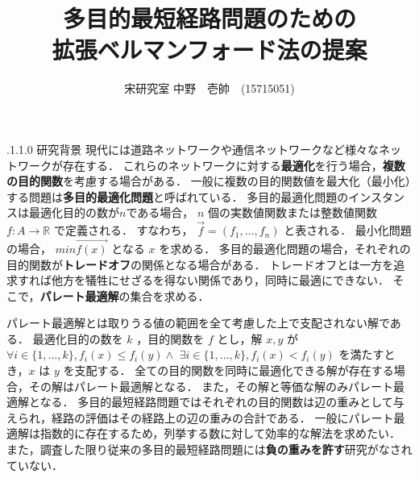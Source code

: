 \documentclass[oneside, 10pt, twocolumn]{jarticle}
\title{\bf{\rm}
多目的最短経路問題のための
\\拡張ベルマンフォード法の提案}
\author{宋研究室
\hspace{15pt}
中野　壱帥　(15715051)}
\date{}
\makeatletter
\def\section{\@startsection {section}{1}{\z@}{-3.5ex plus -1ex minus
-.2ex}{2.3 ex plus .2ex}{\large\bf}}
\renewcommand{\section}{
\@startsection{section}{1}{\z@}
{.1\Cvs \@plus.0\Cdp \@minus.1\Cdp}%
{.1\Cvs \@plus.1\Cdp \@minus.0\Cdp}%
{\reset@font\large\bfseries}}      %
\makeatother
\begin{document}
\maketitle
\thispagestyle{empty}
\section{研究背景}
現代には道路ネットワークや通信ネットワークなど様々なネットワークが存在する．
これらのネットワークに対する\textbf{最適化}を行う場合，\textbf{複数の目的関数}を考慮する場合がある．
一般に複数の目的関数値を最大化（最小化）する問題は\textbf{多目的最適化問題}と呼ばれている．
多目的最適化問題のインスタンスは最適化目的の数が$n$である場合，
$n$ 個の実数値関数または整数値関数 $f : A \rightarrow \mathbb{R}$ で定義される．
すなわち， $\vec{f} = (f_1 , \ldots , f_n)$ と表される．
最小化問題の場合， $min\vec{f(x)}$ となる $x$ を求める．
多目的最適化問題の場合，それぞれの目的関数が\textbf{トレードオフ}の関係となる場合がある．
トレードオフとは一方を追求すれば他方を犠牲にせざるを得ない関係であり，同時に最適にできない．
そこで，\textbf{パレート最適解}の集合を求める．

パレート最適解とは取りうる値の範囲を全て考慮した上で支配されない解である．
最適化目的の数を $k$ ，目的関数を $f$ とし，解 $x,y$ が
$\forall i \in \{1,\ldots,k\},f_i(x) \le f_i(y) \land $
$\exists i \in \{1,\ldots,k\},f_i(x) < f_i(y)$
を満たすとき，$x$ は $y$ を支配する．
全ての目的関数を同時に最適化できる解が存在する場合，その解はパレート最適解となる．
また，その解と等価な解のみパレート最適解となる．
多目的最短経路問題ではそれぞれの目的関数は辺の重みとして与えられ，経路の評価はその経路上の辺の重みの合計である．
一般にパレート最適解は指数的に存在するため，列挙する数に対して効率的な解法を求めたい．
また，調査した限り従来の多目的最短経路問題には\textbf{負の重みを許す}研究がなされていない．
\end{document}
